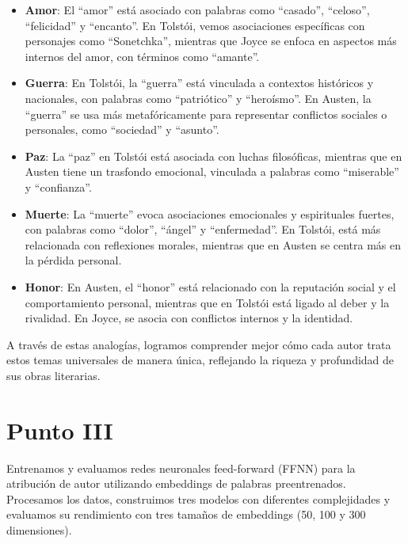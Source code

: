 \documentclass[11pt,english]{article}
\theoremstyle{plain}
\begin{document}
\begin{itemize}
    \item \textbf{Amor}: El ``amor'' está asociado con palabras como ``casado'', ``celoso'', ``felicidad'' y ``encanto''. En Tolstói, vemos asociaciones específicas con personajes como ``Sonetchka'', mientras que Joyce se enfoca en aspectos más internos del amor, con términos como ``amante''.
    
    \item \textbf{Guerra}: En Tolstói, la ``guerra'' está vinculada a contextos históricos y nacionales, con palabras como ``patriótico'' y ``heroísmo''. En Austen, la ``guerra'' se usa más metafóricamente para representar conflictos sociales o personales, como ``sociedad'' y ``asunto''.
    
    \item \textbf{Paz}: La ``paz'' en Tolstói está asociada con luchas filosóficas, mientras que en Austen tiene un trasfondo emocional, vinculada a palabras como ``miserable'' y ``confianza''.
    
    \item \textbf{Muerte}: La ``muerte'' evoca asociaciones emocionales y espirituales fuertes, con palabras como ``dolor'', ``ángel'' y ``enfermedad''. En Tolstói, está más relacionada con reflexiones morales, mientras que en Austen se centra más en la pérdida personal.
    
    \item \textbf{Honor}: En Austen, el ``honor'' está relacionado con la reputación social y el comportamiento personal, mientras que en Tolstói está ligado al deber y la rivalidad. En Joyce, se asocia con conflictos internos y la identidad.
\end{itemize}

A través de estas analogías, logramos comprender mejor cómo cada autor trata estos temas universales de manera única, reflejando la riqueza y profundidad de sus obras literarias.

\section*{Punto III}

Entrenamos y evaluamos redes neuronales feed-forward (FFNN) para la atribución de autor utilizando embeddings de palabras preentrenados. Procesamos los datos, construimos tres modelos con diferentes complejidades y evaluamos su rendimiento con tres tamaños de embeddings (50, 100 y 300 dimensiones).
\end{document}
